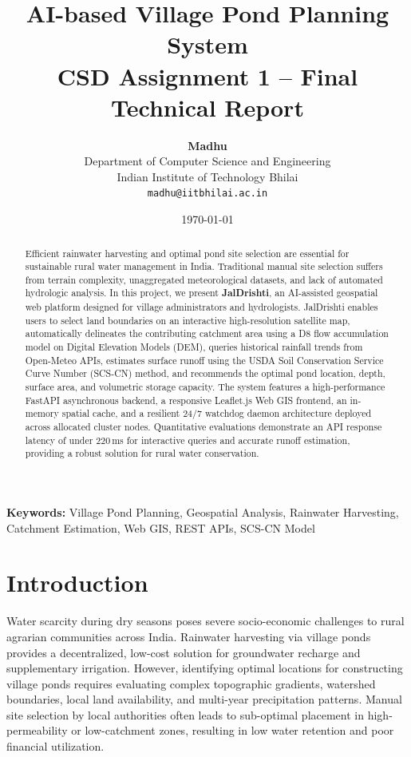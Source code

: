 \documentclass[11pt,a4paper]{article}
\title{\textbf{AI-based Village Pond Planning System}\\ \Large CSD Assignment 1 -- Final Technical Report}
\author{\textbf{Madhu}\\ Department of Computer Science and Engineering\\ Indian Institute of Technology Bhilai\\ \texttt{madhu@iitbhilai.ac.in}}
\date{\today}
\begin{document}
\maketitle

\begin{abstract}
Efficient rainwater harvesting and optimal pond site selection are essential for sustainable rural water management in India. Traditional manual site selection suffers from terrain complexity, unaggregated meteorological datasets, and lack of automated hydrologic analysis. In this project, we present \textbf{JalDrishti}, an AI-assisted geospatial web platform designed for village administrators and hydrologists. JalDrishti enables users to select land boundaries on an interactive high-resolution satellite map, automatically delineates the contributing catchment area using a D8 flow accumulation model on Digital Elevation Models (DEM), queries historical rainfall trends from Open-Meteo APIs, estimates surface runoff using the USDA Soil Conservation Service Curve Number (SCS-CN) method, and recommends the optimal pond location, depth, surface area, and volumetric storage capacity. The system features a high-performance FastAPI asynchronous backend, a responsive Leaflet.js Web GIS frontend, an in-memory spatial cache, and a resilient 24/7 watchdog daemon architecture deployed across allocated cluster nodes. Quantitative evaluations demonstrate an API response latency of under 220\,ms for interactive queries and accurate runoff estimation, providing a robust solution for rural water conservation.
\end{abstract}

\textbf{Keywords:} Village Pond Planning, Geospatial Analysis, Rainwater Harvesting, Catchment Estimation, Web GIS, REST APIs, SCS-CN Model

\section{Introduction}
\label{sec:intro}
Water scarcity during dry seasons poses severe socio-economic challenges to rural agrarian communities across India. Rainwater harvesting via village ponds provides a decentralized, low-cost solution for groundwater recharge and supplementary irrigation. However, identifying optimal locations for constructing village ponds requires evaluating complex topographic gradients, watershed boundaries, local land availability, and multi-year precipitation patterns. Manual site selection by local authorities often leads to sub-optimal placement in high-permeability or low-catchment zones, resulting in low water retention and poor financial utilization.
\end{document}
